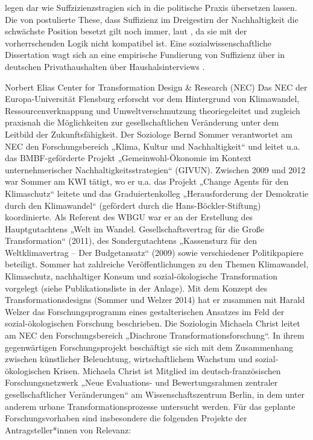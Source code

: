 \cite{Schneidewind2013} legen dar wie Suffzizienzstragien sich in die politische Praxis übersetzen lassen.
Die von \cite{Winterfeld2007} postulierte These, dass Suffizienz im Dreigestirn der Nachhaltigkeit die schwächste Position besetzt gilt noch immer, laut \cite{Winterfeld2007}, da sie mit der vorherrschenden Logik nicht kompatibel ist.
Eine sozialwissenschaftliche Dissertation wagt sich an eine empirische Fundierung von Suffizienz über in deutschen Privathaushalten über Haushalsinterviews \cite{Speck2016}.



Norbert Elias Center for Transformation Design & Research (NEC)
Das NEC der Europa-Universität Flensburg erforscht vor dem Hintergrund von Klimawandel, Ressourcenverknappung und Umweltverschmutzung theoriegeleitet und zugleich praxisnah die Möglichkeiten zur gesellschaftlichen Veränderung unter dem Leitbild der Zukunftsfähigkeit. Der Soziologe Bernd Sommer verantwortet am NEC den Forschungsbereich „Klima, Kultur und Nachhaltigkeit“ und leitet u.a. das BMBF-geförderte Projekt „Gemeinwohl-Ökonomie im Kontext unternehmerischer Nachhaltigkeitsstrategien“ (GIVUN). Zwischen 2009 und 2012 war Sommer am KWI tätigt, wo er u.a. das Projekt „Change Agents für den Klimaschutz“ leitete und das Graduiertenkolleg „Herausforderung der Demokratie durch den Klimawandel“ (gefördert durch die Hans-Böckler-Stiftung) koordinierte. Als Referent des WBGU war er an der Erstellung des Hauptgutachtens „Welt im Wandel. Gesellschaftsvertrag für die Große Transformation“ (2011), des Sondergutachtens „Kassensturz für den Weltklimavertrag – Der Budgetansatz“ (2009) sowie verschiedener Politikpapiere beteiligt. Sommer hat zahlreiche Veröffentlichungen zu den Themen Klimawandel, Klimaschutz, nachhaltiger Konsum und sozial-ökologische Transformation vorgelegt (siehe Publikationsliste in der Anlage). Mit dem Konzept des Transformationsdesigns (Sommer und Welzer 2014) hat er zusammen mit Harald Welzer das Forschungsprogramm eines gestalterischen Ansatzes im Feld der sozial-ökologischen Forschung beschrieben. Die Soziologin Michaela Christ leitet am NEC den Forschungsbereich „Diachrone Transformationsforschung“. In ihrem gegenwärtigen Forschungsprojekt beschäftigt sie sich mit dem Zusammenhang zwischen künstlicher Beleuchtung, wirtschaftlichem Wachstum und sozial-ökologischen Krisen. Michaela Christ ist Mitglied im deutsch-französischen Forschungsnetzwerk „Neue Evaluations- und Bewertungsrahmen zentraler gesellschaftlicher Veränderungen“ am Wissenschaftszentrum Berlin, in dem unter anderem urbane Transformationsprozesse untersucht werden. Für das geplante Forschungsvorhaben sind insbesondere die folgenden Projekte der Antragsteller*innen von Relevanz:
